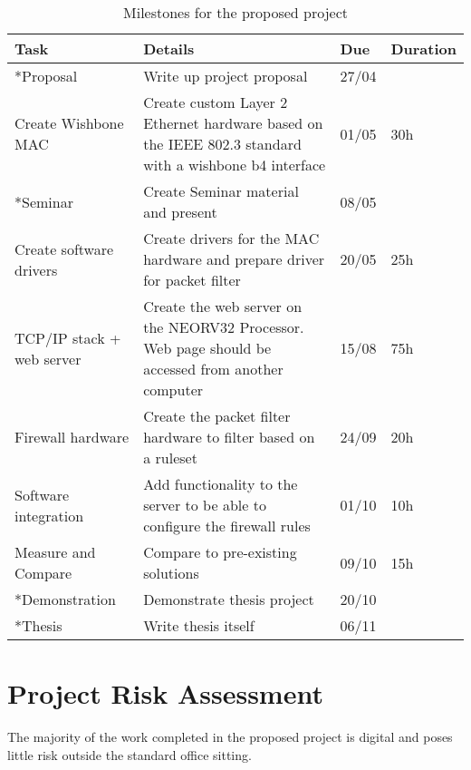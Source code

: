 \begin{table}[hbt!]
\centering%
    \caption{ Milestones for the proposed project}\label{table:milestones}
    \begin{tabularx}{\textwidth}{ lXll }
        \hline
        Task                            & Details & Due & Duration  \\ \hline
        *Proposal                        & Write up project proposal & 27/04 & \\
        Create Wishbone MAC             &  Create custom Layer 2 Ethernet hardware based on the IEEE 802.3 standard with a wishbone b4 interface & 01/05  & 30h \\
        *Seminar                         & Create Seminar material and present & 08/05 & \\
        Create software drivers         & Create drivers for the MAC hardware and prepare driver for packet filter & 20/05 & 25h \\
        TCP/IP stack + web server       &  Create the web server on the NEORV32 Processor. Web page should be accessed from another computer  & 15/08     & 75h \\ 
        Firewall hardware               &  Create the packet filter hardware to filter based on a ruleset & 24/09    & 20h \\ 
        Software integration            &  Add functionality to the server to be able to configure the firewall rules & 01/10  & 10h \\ 
        Measure and Compare             &  Compare to pre-existing solutions  & 09/10     & 15h \\ 

        *Demonstration                   & Demonstrate thesis project & 20/10 & \\
        *Thesis                          & Write thesis itself & 06/11 & \\
        \hline
        \end{tabularx}
\end{table}
 

\newpage

\section{Project Risk Assessment}

The majority of the work completed in the proposed project is digital and poses little risk outside the standard office sitting. 

